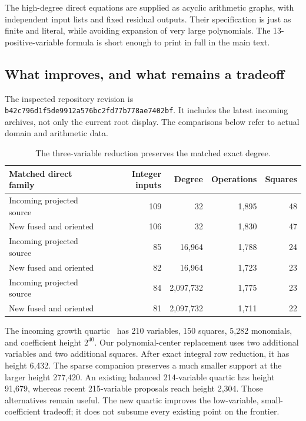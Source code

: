 \documentclass[10pt,letterpaper]{article}
\theoremstyle{remark}\newtheorem{remark}[theorem]{Remark}
\newcommand{\pathtext}[1]{\nolinkurl{#1}}
\begin{document}
The high-degree direct equations are supplied as acyclic arithmetic graphs,
with independent input lists and fixed residual outputs. Their specification
is just as finite and literal, while avoiding expansion of very large
polynomials. The 13-positive-variable formula is short enough to print in
full in the main text.

\subsection{What improves, and what remains a tradeoff}

The inspected repository revision is
\pathtext{b42c796d1f5de9912a576bc2fd77b778ae7402bf}.
It includes the latest incoming archives, not only the current root display.
The comparisons below refer to actual domain and arithmetic data.

\begin{table}[ht]
\centering\small
\begin{tabular}{@{}lrrrr@{}}
\toprule
Matched direct family & Integer inputs & Degree & Operations & Squares\\
\midrule
Incoming projected source &109&32&1,895&48\\
New fused and oriented &106&32&1,830&47\\
Incoming projected source &85&16,964&1,788&24\\
New fused and oriented &82&16,964&1,723&23\\
Incoming projected source &84&2,097,732&1,775&23\\
New fused and oriented &81&2,097,732&1,711&22\\
\bottomrule
\end{tabular}
\caption{The three-variable reduction preserves the matched exact degree.}
\end{table}

The incoming growth quartic~\cite{growth} has 210 variables, 150 squares, 5,282 monomials,
and coefficient height $2^{40}$. Our polynomial-center replacement uses two
additional variables and two additional squares. After exact integral row
reduction, it has height 6,432. The sparse companion preserves a much smaller
support at the larger height 277,420. An existing balanced 214-variable
quartic has height 91,679, whereas recent 215-variable proposals reach
height 2,304. Those alternatives remain useful. The new quartic improves
the low-variable, small-coefficient tradeoff; it does not subsume every
existing point on the frontier.
\end{document}
